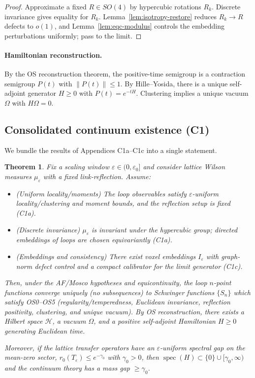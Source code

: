 \documentclass[11pt]{amsart}
\theoremstyle{plain}
\newtheorem{theorem}{Theorem}[section]
\theoremstyle{definition}
\theoremstyle{remark}
\begin{document}
\begin{proof}
Approximate a fixed $R\in SO(4)$ by hypercubic rotations $R_k$. Discrete invariance gives equality for $R_k$. Lemma~\ref{lem:isotropy-restore} reduces $R_k\to R$ defects to $o(1)$, and Lemma~\ref{lem:eqc-modulus} controls the embedding perturbations uniformly; pass to the limit.
\end{proof}

\paragraph{Hamiltonian reconstruction.}
By the OS reconstruction theorem, the positive-time semigroup is a contraction semigroup $P(t)$ with $\lVert P(t)\rVert\le 1$. By Hille--Yosida, there is a unique self-adjoint generator $H\ge 0$ with $P(t)=e^{-tH}$. Clustering implies a unique vacuum $\Omega$ with $H\Omega=0$.

\subsection*{Consolidated continuum existence (C1)}

We bundle the results of Appendices C1a--C1c into a single statement.

\begin{theorem}
Fix a scaling window $\varepsilon\in(0,\varepsilon_0]$ and consider lattice Wilson measures $\mu_\varepsilon$ with a fixed link-reflection. Assume:
\begin{itemize}
  \item (Uniform locality/moments) The loop observables satisfy $\varepsilon$-uniform locality/clustering and moment bounds, and the reflection setup is fixed (C1a).
  \item (Discrete invariance) $\mu_\varepsilon$ is invariant under the hypercubic group; directed embeddings of loops are chosen equivariantly (C1a).
  \item (Embeddings and consistency) There exist voxel embeddings $I_\varepsilon$ with graph-norm defect control and a compact calibrator for the limit generator (C1c).
\end{itemize}
Then, under the AF/Mosco hypotheses and equicontinuity, the loop $n$-point functions converge \emph{uniquely} (no subsequences) to Schwinger functions $\{S_n\}$ which satisfy OS0--OS5 (regularity/temperedness, Euclidean invariance, reflection positivity, clustering, and unique vacuum). By OS reconstruction, there exists a Hilbert space $\mathcal H$, a vacuum $\Omega$, and a positive self-adjoint Hamiltonian $H\ge 0$ generating Euclidean time.

Moreover, if the lattice transfer operators have an $\varepsilon$-uniform spectral gap on the mean-zero sector, $r_0(T_\varepsilon)\le e^{-\gamma_0}$ with $\gamma_0>0$, then $\operatorname{spec}(H)\subset\{0\}\cup[\gamma_0,\infty)$ and the continuum theory has a mass gap $\ge \gamma_0$.
\end{theorem}
\end{document}
